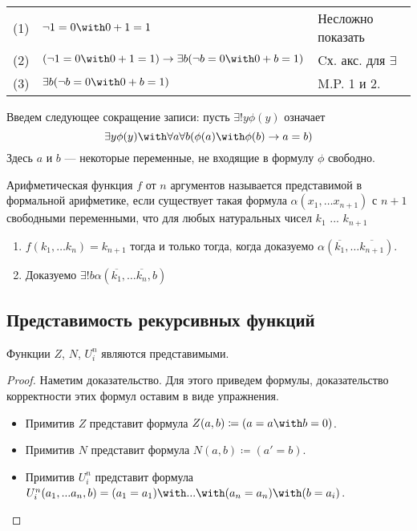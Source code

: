 \begin{tabular}{lll}
(1) & $\neg 1 = 0 \with 0 + 1 = 1$ & Несложно показать\\
(2) & $(\neg 1 = 0 \with 0 + 1 = 1) \rightarrow \exists b (\neg b = 0 \with 0 + b = 1)$ & Cх. акс. для $\exists$\\
(3) & $\exists b (\neg b = 0 \with 0 + b = 1)$ & M.P. 1 и 2.
\end{tabular}

\begin{definition} Введем следующее сокращение записи:
пусть $\exists ! y \phi (y)$ означает $$\exists y \phi (y) \with \forall a \forall b (\phi(a) \with \phi(b) \rightarrow a=b)$$
Здесь $a$ и $b$ --- некоторые переменные, не входящие в формулу $\phi$ свободно.
\end{definition}

\begin{definition} Арифметическая функция $f$ от $n$ аргументов называется представимой в 
формальной арифметике, если существует такая формула $\alpha (x_1, \dots x_{n+1})$ с $n+1$ 
свободными переменными, что для любых натуральных чисел $k_1$ ... $k_{n+1}$
\begin{enumerate}
\item $f(k_1, \dots k_n) = k_{n+1}$ тогда и только тогда, когда доказуемо 
$\alpha (\overline{k_1}, \dots \overline{k_{n+1}})$.
\item Доказуемо $\exists ! b \alpha (\overline{k_1}, \dots \overline{k_n}, b)$
\end{enumerate}
\end{definition} 


\subsection{Представимость рекурсивных функций}

\begin{theorem} Функции $Z$, $N$, $U^n_i$ являются представимыми. \end{theorem}
\begin{proof}
Наметим доказательство. Для этого приведем формулы, доказательство корректности этих 
формул оставим в виде упражнения.
\begin{itemize}
\item Примитив $Z$ представит формула $Z (a, b) \coloneqq  (a=a \with b=0)$.
\item Примитив $N$ представит формула $N (a, b) \coloneqq  (a' = b)$.
\item Примитив $U^n_i$ представит формула $U^n_i (a_1, ...a_n, b) = (a_1=a_1) \with ... \with (a_n=a_n) \with (b= a_i)$.
\end{itemize}
\end{proof}

